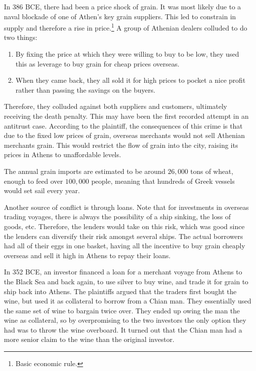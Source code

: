 \documentclass{article}
\begin{document}
    \begin{example}
      \label{ex:first-antitrust-case}
      In 386 BCE, there had been a price shock of grain. It was most likely due to a naval blockade of one of Athen's key grain suppliers. This led to constrain in supply and therefore a rise in price.\footnote{Basic economic rule. } A group of Athenian dealers colluded to do two things: 
      \begin{enumerate}
        \item By fixing the price at which they were willing to buy to be low, they used this as leverage to buy grain for cheap prices overseas. 
        \item When they came back, they all sold it for high prices to pocket a nice profit rather than passing the savings on the buyers. 
      \end{enumerate}
      Therefore, they colluded against both suppliers and customers, ultimately receiving the death penalty. This may have been the first recorded attempt in an antitrust case. According to the plaintiff, the consequences of this crime is that due to the fixed low prices of grain, overseas merchants would not sell Athenian merchants grain. This would restrict the flow of grain into the city, raising its prices in Athens to unaffordable levels. 
    \end{example}

    The annual grain imports are estimated to be around $26,000$ tons of wheat, enough to feed over $100,000$ people, meaning that hundreds of Greek vessels would set sail every year. 

    Another source of conflict is through loans. Note that for investments in overseas trading voyages, there is always the possibility of a ship sinking, the loss of goods, etc. Therefore, the lenders would take on this risk, which was good since the lenders can diversify their risk amongst several ships. The actual borrowers had all of their eggs in one basket, having all the incentive to buy grain cheaply overseas and sell it high in Athens to repay their loans. 

    \begin{example}
      \label{ex:a-maritime-loan-in-352-bce}
      In 352 BCE, an investor financed a loan for a merchant voyage from Athens to the Black Sea and back again, to use silver to buy wine, and trade it for grain to ship back into Athens. The plaintiffs argued that the traders first bought the wine, but used it as collateral to borrow from a Chian man. They essentially used the same set of wine to bargain twice over. They ended up owing the man the wine as collateral, so by overpromising to the two investors the only option they had was to throw the wine overboard. It turned out that the Chian man had a more senior claim to the wine than the original investor. 
    \end{example}
\end{document}
